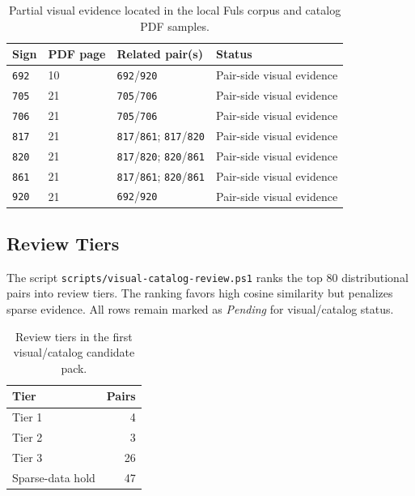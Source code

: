 \begin{table}[htbp]
\centering
\begin{tabular}{llll}
\toprule
\textbf{Sign} & \textbf{PDF page} & \textbf{Related pair(s)} & \textbf{Status} \\
\midrule
\texttt{692} & 10 & \texttt{692}/\texttt{920} & Pair-side visual evidence \\
\texttt{705} & 21 & \texttt{705}/\texttt{706} & Pair-side visual evidence \\
\texttt{706} & 21 & \texttt{705}/\texttt{706} & Pair-side visual evidence \\
\texttt{817} & 21 & \texttt{817}/\texttt{861}; \texttt{817}/\texttt{820} & Pair-side visual evidence \\
\texttt{820} & 21 & \texttt{817}/\texttt{820}; \texttt{820}/\texttt{861} & Pair-side visual evidence \\
\texttt{861} & 21 & \texttt{817}/\texttt{861}; \texttt{820}/\texttt{861} & Pair-side visual evidence \\
\texttt{920} & 21 & \texttt{692}/\texttt{920} & Pair-side visual evidence \\
\bottomrule
\end{tabular}
\caption{Partial visual evidence located in the local Fuls corpus and catalog PDF samples.}
\label{tab:partial-visual-evidence}
\end{table}

\subsection{Review Tiers}

The script \texttt{scripts/visual-catalog-review.ps1} ranks the top 80 distributional pairs into review tiers. The ranking favors high cosine similarity but penalizes sparse evidence. All rows remain marked as \emph{Pending} for visual/catalog status.

\begin{table}[htbp]
\centering
\begin{tabular}{lr}
\toprule
\textbf{Tier} & \textbf{Pairs} \\
\midrule
Tier 1 & 4 \\
Tier 2 & 3 \\
Tier 3 & 26 \\
Sparse-data hold & 47 \\
\bottomrule
\end{tabular}
\caption{Review tiers in the first visual/catalog candidate pack.}
\label{tab:visual-review-tiers}
\end{table}

